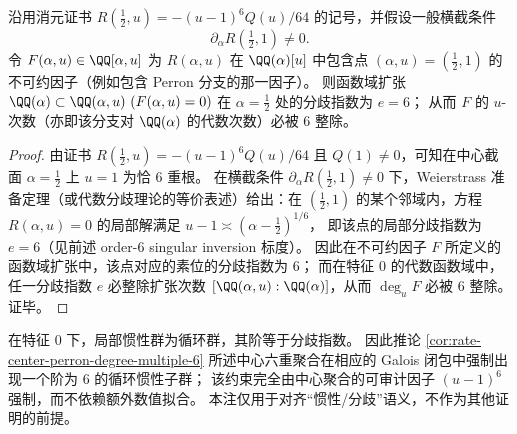 \begin{corollary}\label{cor:rate-center-perron-degree-multiple-6}
沿用消元证书 \(R(\tfrac12,u)=-(u-1)^6Q(u)/64\) 的记号，并假设一般横截条件
\[
\partial_\alpha R\!\left(\tfrac12,1\right)\neq 0.
\]
令 \(F(\alpha,u)\in\QQ[\alpha,u]\) 为 \(R(\alpha,u)\) 在 \(\QQ(\alpha)[u]\) 中包含点 \((\alpha,u)=(\tfrac12,1)\) 的不可约因子（例如包含 Perron 分支的那一因子）。
则函数域扩张
\(
\QQ(\alpha)\subset \QQ(\alpha,u)\ (F(\alpha,u)=0)
\)
在 \(\alpha=\tfrac12\) 处的分歧指数为 \(e=6\)；
从而 \(F\) 的 \(u\)-次数（亦即该分支对 \(\QQ(\alpha)\) 的代数次数）必被 \(6\) 整除。
\end{corollary}
\begin{proof}
由证书 \(R(\tfrac12,u)=-(u-1)^6Q(u)/64\) 且 \(Q(1)\neq 0\)，可知在中心截面 \(\alpha=\tfrac12\) 上 \(u=1\) 为恰 \(6\) 重根。
在横截条件 \(\partial_\alpha R(\tfrac12,1)\neq 0\) 下，Weierstrass 准备定理（或代数分歧理论的等价表述）给出：在 \((\tfrac12,1)\) 的某个邻域内，方程 \(R(\alpha,u)=0\) 的局部解满足
\(
u-1\asymp (\alpha-\tfrac12)^{1/6}
\)，
即该点的局部分歧指数为 \(e=6\)（见前述 order-\(6\) singular inversion 标度）。
因此在不可约因子 \(F\) 所定义的函数域扩张中，该点对应的素位的分歧指数为 \(6\)；
而在特征 \(0\) 的代数函数域中，任一分歧指数 \(e\) 必整除扩张次数 \([\QQ(\alpha,u):\QQ(\alpha)]\)，从而 \(\deg_u F\) 必被 \(6\) 整除。证毕。
\end{proof}

\begin{remark}\label{rem:rate-center-inertia-c6}
在特征 \(0\) 下，局部惯性群为循环群，其阶等于分歧指数。
因此推论 \ref{cor:rate-center-perron-degree-multiple-6} 所述中心六重聚合在相应的 Galois 闭包中强制出现一个阶为 \(6\) 的循环惯性子群；
该约束完全由中心聚合的可审计因子 \((u-1)^6\) 强制，而不依赖额外数值拟合。
本注仅用于对齐“惯性/分歧”语义，不作为其他证明的前提。
\end{remark}
